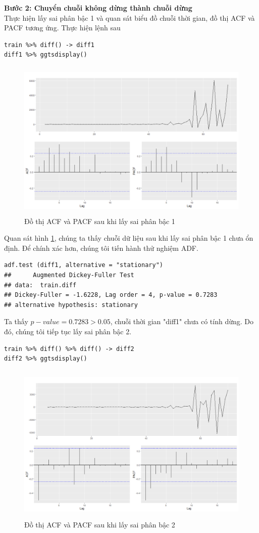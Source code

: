 \documentclass[12pt, a4paper,oneside]{book}
\theoremstyle{definition}
\begin{document}
\textbf{Bước 2: Chuyển chuỗi không dừng thành chuỗi dừng}\\
Thực hiện lấy sai phân bậc 1 và quan sát biểu đồ chuỗi thời gian, đồ thị ACF và PACF tương ứng. Thực hiện lệnh sau
\begin{lstlisting}
train %>% diff() -> diff1
diff1 %>% ggtsdisplay()
\end{lstlisting}
\begin{figure}[!htb]
	\centering
	\includegraphics[width=1\linewidth,height=7.7cm]{anh/diff1}
	\vskip-4mm 
	\caption{Đồ thị ACF và PACF sau khi lấy sai phân bậc 1}  
	\label{diff1}
\end{figure}
Quan sát hình \ref{diff1}, chúng ta thấy chuỗi dữ liệu sau khi lấy sai phân bậc 1 chưa ổn định. Để chính xác hơn, chúng tôi tiến hành thử nghiệm ADF.\\
\begin{lstlisting}
adf.test (diff1, alternative = "stationary")
##  	Augmented Dickey-Fuller Test
## data:  train.diff
## Dickey-Fuller = -1.6228, Lag order = 4, p-value = 0.7283
## alternative hypothesis: stationary
\end{lstlisting}
Ta thấy $p-value = 0.7283 > 0.05$, chuỗi thời gian "diff1" chưa có tính dừng. Do đó, chúng tôi tiếp tục lấy sai phân bậc 2.
\begin{lstlisting}
train %>% diff() %>% diff() -> diff2
diff2 %>% ggtsdisplay()
\end{lstlisting}
\begin{figure}[!htb]
	\centering
	\includegraphics[width=1\linewidth,height=7.7cm]{anh/US2}
	\vskip-4mm 
	\caption{Đồ thị ACF và PACF sau khi lấy sai phân bậc 2}  
	\label{diff2}
\end{figure}
\end{document}
